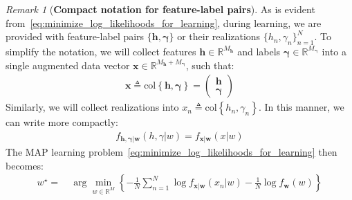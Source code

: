 \documentclass[oneside,11pt]{amsart}
\def\x{{\boldsymbol{x}}}
\theoremstyle{remark}
\newtheorem{remark}{Remark}[section]
\begin{document}
{\begin{remark}[\textbf{Compact notation for feature-label pairs}]{As is evident from~\eqref{eq:minimize_log_likelihoods_for_learning}, during learning, we are provided with feature-label pairs \( \{ \boldsymbol{h}, \boldsymbol{\gamma} \} \) or their realizations \( \{ h_n, \gamma_n \}_{n=1}^N \). To simplify the notation, we will collect features \( \boldsymbol{h} \in \mathds{R}^{M_{\boldsymbol{h}}} \) and labels \( \boldsymbol{\gamma} \in \mathds{R}^{M_{\boldsymbol{\gamma}}} \) into a single augmented data vector \( \x \in \mathds{R}^{M_{\boldsymbol{h}} + M_{\boldsymbol{\gamma}}} \), such that:
  \begin{align}
    \x \triangleq \mathrm{col}\left\{ \boldsymbol{h}, \boldsymbol{\gamma} \right\} = \begin{pmatrix} \boldsymbol{h} \\ \boldsymbol{\gamma} \end{pmatrix}
  \end{align}
  Similarly, we will collect realizations into \( x_n \triangleq \mathrm{col}\left\{ h_n, \gamma_n \right\} \). In this manner, we can write more compactly:
  \begin{align}
    f_{\boldsymbol{h}, \boldsymbol{\gamma} | \boldsymbol{w} } \left( {h}, {\gamma} | w \right) = f_{\x | \boldsymbol{w} } \left( x | w \right)
  \end{align}
  The MAP learning problem~\eqref{eq:minimize_log_likelihoods_for_learning} then becomes:
  \begin{align}
    w^{\star} =&\: \arg\min_{w \in \mathds{R}^M} \left\{ -\frac{1}{N} \sum_{n=1}^N \log f_{\x | \boldsymbol{w} } \left( x_n | w \right) - \frac{1}{N} \log f_{\boldsymbol{w}}(w) \right\}
  \end{align} 
  }
  \end{remark}
  }
\end{document}
